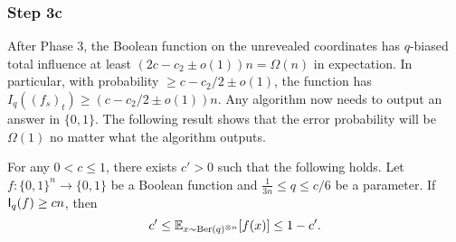 \subsubsection{Step 3c}
After Phase 3, the Boolean function on the unrevealed coordinates has $q$-biased total influence at least $(2c-c_2\pm o(1))n = \Omega(n)$ in expectation.
In particular, with probability $\ge c-c_2/2\pm o(1)$, the function has $I_q((f_{s})_t) \ge (c-c_2/2\pm o(1))n$.
Any algorithm now needs to output an answer in $\{0,1\}$.
The following result shows that the error probability will be $\Omega(1)$ no matter what the algorithm outputs.

\begin{lemma} \label{lem:inf:phase-3:step-3}
  For any $0 < c \le 1$, there exists $c'>0$ such that the following holds.
  Let $f: \{0,1\}^n\to \{0,1\}$ be a Boolean function and $\frac 1{3n} \le q \le c/6$ be a parameter.
  If $\operatorname{\mathsf{I}}_q(f) \ge cn$, then \[c' \le \mathbb{E}_{x \sim \operatorname{\mathrm{Ber}}(q)^{\otimes n}} [f(x)] \le 1 - c'.\]
\end{lemma}
